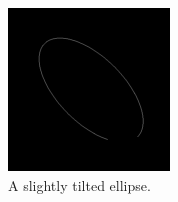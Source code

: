 \begin{figure}
	\centering
	\begin{subfigure}{0.48\linewidth}
		\centering
		\includegraphics[width=\linewidth]{Materials/tEllipse}
		\caption{A slightly tilted ellipse.\newline\newline}
		\label{tEllipse}
	\end{subfigure}
	\hfill
	\begin{subfigure}{0.48\linewidth}
		\centering

\end{subfigure}
\end{figure}

